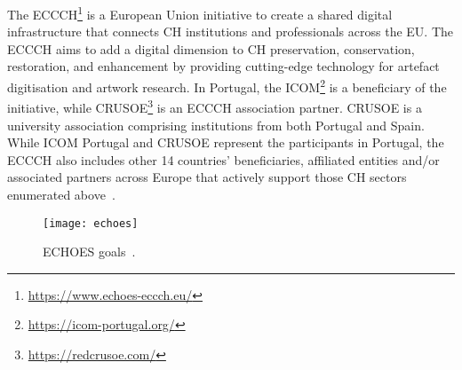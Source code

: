 The \gls{ECCCH}\footnote{\url{https://www.echoes-eccch.eu/}} is a European Union initiative 
to create a shared digital infrastructure that connects \gls{CH} institutions and professionals across the \gls{EU}.
The \gls{ECCCH} aims to add a digital dimension to \gls{CH} preservation, conservation, restoration, and enhancement 
by providing cutting-edge technology for artefact digitisation and artwork research. 
In Portugal, the \gls{ICOM}\footnote{\url{https://icom-portugal.org/}} is a beneficiary of the initiative, while \gls{CRUSOE}\footnote{\url{https://redcrusoe.com/}} is an \gls{ECCCH} association partner. \gls{CRUSOE} is a university association comprising institutions from both Portugal and Spain.
While \gls{ICOM} Portugal and \gls{CRUSOE} represent the participants in Portugal, the \gls{ECCCH} also includes other 14 countries' beneficiaries, affiliated entities and/or associated partners across Europe that actively support those \gls{CH} sectors enumerated above~\cite{ecchoes}.


\begin{figure}[h!]
    \centering
    \texttt{[image: echoes]}
    \caption{\gls{ECHOES} goals~\cite{ecchoes}.} 
    \label{fig:echoes}
\end{figure}
\FloatBarrier

